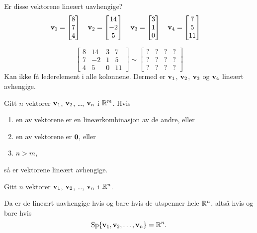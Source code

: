 \begin{ex}
Er disse vektorene lineært uavhengige?
\[
\mathbf{v}_1 = \begin{bmatrix} 8 \\ 7 \\ 4 \end{bmatrix}\quad
\mathbf{v}_2 = \begin{bmatrix} 14 \\ -2 \\ 5 \end{bmatrix}\quad
\mathbf{v}_3 = \begin{bmatrix} 3 \\ 1 \\ 0 \end{bmatrix}\quad
\mathbf{v}_4 = \begin{bmatrix} 7 \\ 5 \\ 11 \end{bmatrix}\quad
\]

\[
\begin{bmatrix}
8 & 14 & 3 & 7 \\
7 & -2 & 1 & 5 \\
4 & 5 & 0 & 11
\end{bmatrix}
\sim
\begin{bmatrix}
? & ? & ? & ? \\
? & ? & ? & ? \\
? & ? & ? & ?
\end{bmatrix}
\]
Kan ikke få lederelement i alle kolonnene.  Dermed er
$\mathbf{v}_1$, $\mathbf{v}_2$, $\mathbf{v}_3$ og $\mathbf{v}_4$ lineært avhengige.
\end{ex}




\begin{thm}
Gitt $n$ vektorer  $\mathbf{v}_1$, $\mathbf{v}_2$, \ldots, $\mathbf{v}_n$ i $\mathbb{R}^m$.  Hvis
\begin{enumerate}
\item en av vektorene er en lineærkombinasjon av de andre, eller
\item en av vektorene er $\mathbf{0}$, eller
\item $n > m$,
\end{enumerate}
så er vektorene lineært avhengige.
\end{thm}



\begin{thm}
Gitt $n$ vektorer $\mathbf{v}_1$, $\mathbf{v}_2$, \ldots, $\mathbf{v}_n$ i $\mathbb{R}^n$.

Da er de lineært uavhengige hvis og bare hvis de utspenner hele $\mathbb{R}^n$,
altså hvis og bare hvis
\[
\operatorname{Sp} \{ \mathbf{v}_1, \mathbf{v}_2, \ldots, \mathbf{v}_n \} = \mathbb{R}^n.
\]
\end{thm}




\kapittelslutt
